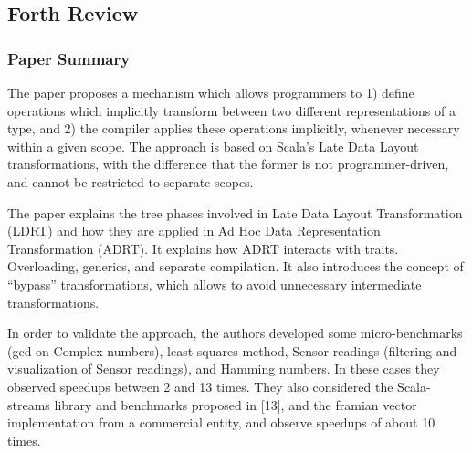 \documentclass[9pt]{article}
\begin{document}
\newpage

\subsection{Forth Review}

\subsubsection{Paper Summary}

The paper proposes a mechanism which allows programmers to 1) define operations which
implicitly transform between two different representations of a type, and 2) the compiler
applies these operations implicitly, whenever necessary within a given scope. The approach
is based on Scala’s Late Data Layout transformations, with the difference that the former
is not programmer-driven, and cannot be restricted to separate scopes.

\vspace{5mm}

The paper explains the tree phases involved in Late Data Layout Transformation (LDRT) and
how they are applied in  Ad Hoc Data Representation Transformation (ADRT). It explains how
ADRT interacts with traits. Overloading, generics, and separate compilation. It also introduces
the concept of “bypass” transformations, which allows to avoid unnecessary intermediate
transformations.

\vspace{5mm}

In order to validate the approach, the authors developed some micro-benchmarks (gcd on
Complex numbers), least squares method, Sensor readings  (filtering and visualization of
Sensor readings), and Hamming numbers. In these cases they observed speedups between
2 and 13 times. They also considered the Scala-streams library and benchmarks
proposed in [13], and the framian vector implementation from a commercial entity, and
observe speedups of about 10 times.

\vspace{5mm}
\end{document}
